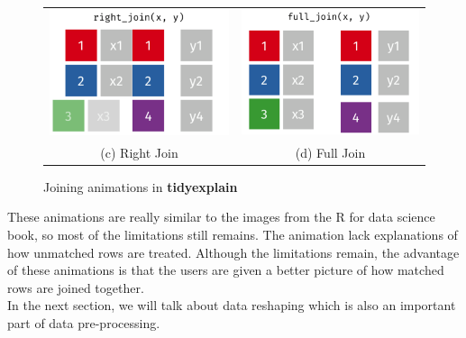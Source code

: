 \begin{figure}[H]
\begin{tabular}{cc}
     \includegraphics[scale = 0.25]{Masters-Thesis/img/ggrightj.png} & \includegraphics[scale = 0.25]{Masters-Thesis/img/ggfullj.png} \\
    (c) Right Join & (d) Full Join \\[6pt]
    \end{tabular}
    \caption{Joining animations in \textbf{tidyexplain}}
    \label{fig:tidyejoin}
\end{figure}

These animations are really similar to the images from the R for data science book, so most of the limitations still remains. The animation lack explanations of how unmatched rows are treated. Although the limitations remain, the advantage of these animations is that the users are given a better picture of how matched rows are joined together. 
\\
In the next section, we will talk about data reshaping which is also an important part of data pre-processing. 

